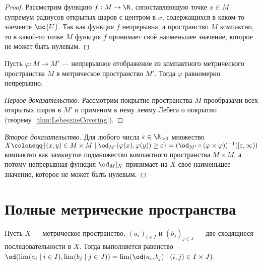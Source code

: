 \documentclass[
	extrafontsizes,
	11pt,
	hyphens,
]{memoir}
\begin{document}
\begin{proof}
Рассмотрим функцию \(f : M \to \R\), сопоставляющую точке \(x \in M\) супремум радиусов открытых шаров с центром в \(x\), содержащихся в каком-то элементе \(\mc{U}\).
Так как функция \(f\) непрерывна, а пространство \(M\) компактно, то в какой-то точке \(M\) функция \(f\) принимает своё наименьшее значение, которое не может быть нулевым.
\end{proof}

\begin{theorem}
Пусть \(\varphi : M \to M'\) --- непрерывное отображение из компактного метрического пространства \(M\) в метрическое пространство \(M'\).%
\label{thm:HeineCantor}
Тогда \(\varphi\) равномерно непрерывно.
\end{theorem}

\begin{proof}[Первое доказательство]
Рассмотрим покрытие пространства \(M\) прообразами всех открытых шаров в \(M'\) и применим к нему лемму Лебега о покрытии
(теорему~\ref{thm:LebesgueCovering}).
\end{proof}

\begin{proof}[Второе доказательство]
Для любого числа \(\varepsilon \in \R_{>0}\)
множество
\(
X \coloneqq
\{(x, y) \in M \times M \mid \od_{M'}(\varphi(x),\varphi(y)) \geq \varepsilon\}
=
({\od_{M'}} \circ (\varphi \times \varphi))^{-1}([\varepsilon, \infty))
\)
компактно как замкнутое подмножество компактного пространства \(M \times M\), а потому непрерывная функция \({\od_M}|_X\) принимает на \(X\) своё наименьшее значение, которое не может быть нулевым.
\end{proof}


\section{Полные метрические пространства}

\begin{observation} \label{obs:SeqLimDist}
Пусть \(X\) --- метрическое пространство, \((a_i)_{i \in I}\) и \((b_j)_{j \in J}\) --- две сходящиеся последовательности в \(X\). Тогда выполняется равенство
\(\od(\lim (a_i \mid i \in I), \lim (b_j \mid j \in J)) = \lim (\od(a_i, b_j) \mid (i,j) \in I \times J)\).
\end{observation}
\end{document}
